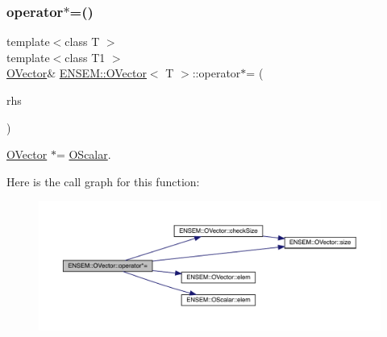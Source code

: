 \subsubsection{\texorpdfstring{operator$\ast$=()}{operator*=()}\hspace{0.1cm}{\footnotesize\ttfamily [2/4]}}
{\footnotesize\ttfamily template$<$class T $>$ \\
template$<$class T1 $>$ \\
\mbox{\hyperlink{classENSEM_1_1OVector}{O\+Vector}}\& \mbox{\hyperlink{classENSEM_1_1OVector}{E\+N\+S\+E\+M\+::\+O\+Vector}}$<$ T $>$\+::operator$\ast$= (\begin{DoxyParamCaption}\item[{const \mbox{\hyperlink{classENSEM_1_1OScalar}{O\+Scalar}}$<$ T1 $>$ \&}]{rhs }\end{DoxyParamCaption})\hspace{0.3cm}{\ttfamily [inline]}}



\mbox{\hyperlink{classENSEM_1_1OVector}{O\+Vector}} $\ast$= \mbox{\hyperlink{classENSEM_1_1OScalar}{O\+Scalar}}. 

Here is the call graph for this function\+:
\nopagebreak
\begin{figure}[H]
\begin{center}
\leavevmode
\includegraphics[width=350pt]{d0/d8d/classENSEM_1_1OVector_a55710cffaf6c877d2465af80ad8b6c49_cgraph}
\end{center}
\end{figure}
\mbox{\label{classENSEM_1_1OVector_ab1d7773b4a23e20961ece98c90b915b4}} 
